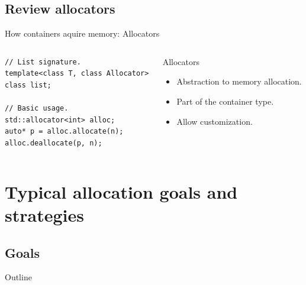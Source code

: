 \documentclass[10pt,aspectratio=169]{beamer}
\begin{document}
\subsection{Review allocators}
\begin{frame}[fragile]{How containers aquire memory: Allocators}
\begin{columns}
\begin{column}{0.45\textwidth}
\begin{lstlisting}
// List signature.
template<class T, class Allocator>
class list;

// Basic usage.
std::allocator<int> alloc;
auto* p = alloc.allocate(n);
alloc.deallocate(p, n);
\end{lstlisting}
\end{column}

\begin{column}{0.45\textwidth}
\begin{block} {Allocators}
\begin{itemize}
\item Abstraction to memory allocation.
\item Part of the container type.
\item Allow customization.
\end{itemize}
\end{block}
\end{column}
\end{columns}
\end{frame}

\section{Typical allocation goals and strategies}
\subsection{Goals}

\begin{frame}{Outline}
\end{frame}
\end{document}
